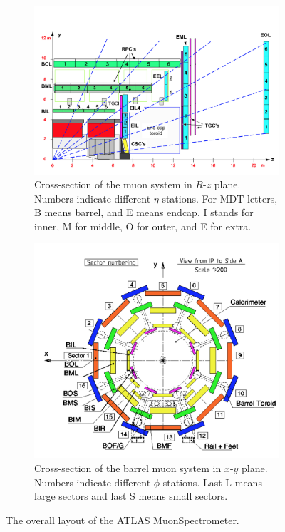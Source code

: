 \begin{figure}[h!]
\centering
\captionsetup{justification=centering}
    \begin{subfigure}[b]{0.5\textwidth}
        \includegraphics[width=\textwidth]{figures/detector/MS_rz}
        \caption{Cross-section of the muon system in $R$-$z$ plane. Numbers indicate different $\eta$ stations. For MDT letters, B means barrel, and E means endcap. I stands for inner, M for middle, O for outer, and E for extra.}
        \label{fig:MS_rz}
    \end{subfigure}
    \quad
    \begin{subfigure}[b]{0.3\textwidth}
        \includegraphics[width=\textwidth]{figures/detector/MS_phi}
        \caption{Cross-section of the barrel muon system in $x$-$y$ plane. Numbers indicate different $\phi$ stations. Last L means large sectors and last S means small sectors.}
        \label{fig:MS_phi}
    \end{subfigure}
\caption{The overall layout of the ATLAS MuonSpectrometer.}
\label{fig:Det_MS}
\end{figure}

